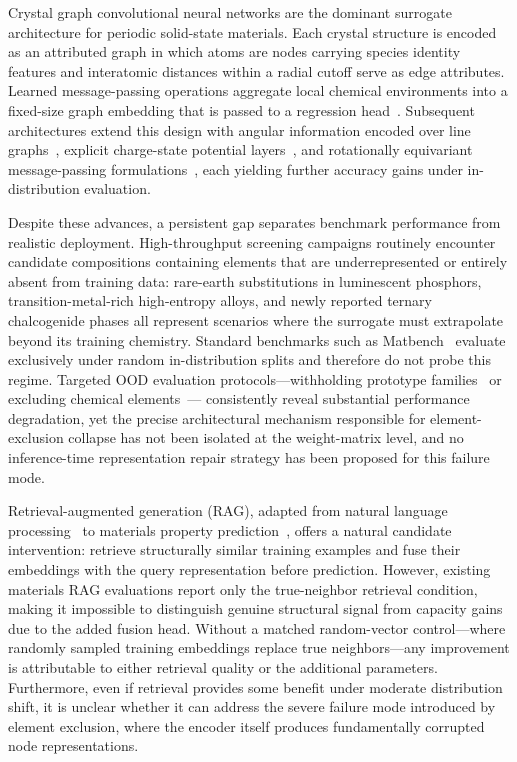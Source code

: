 \documentclass[final,5p,twocolumn,10pt]{elsarticle}
\begin{document}
Crystal graph convolutional neural networks are the dominant surrogate architecture
for periodic solid-state materials. Each crystal structure is encoded as an
attributed graph in which atoms are nodes carrying species identity features
and interatomic distances within a radial cutoff serve as edge attributes.
Learned message-passing operations aggregate local chemical environments into
a fixed-size graph embedding that is passed to a regression head~\cite{xie2018crystal}.
Subsequent architectures extend this design with angular information encoded
over line graphs~\cite{choudhary2021atomistic}, explicit charge-state potential
layers~\cite{deng2023chgnet}, and rotationally equivariant message-passing
formulations~\cite{batatia2022mace}, each yielding further accuracy gains
under in-distribution evaluation.

Despite these advances, a persistent gap separates benchmark performance from
realistic deployment. High-throughput screening campaigns routinely encounter
candidate compositions containing elements that are underrepresented or entirely
absent from training data: rare-earth substitutions in luminescent phosphors,
transition-metal-rich high-entropy alloys, and newly reported ternary chalcogenide
phases all represent scenarios where the surrogate must extrapolate beyond its
training chemistry. Standard benchmarks such as Matbench~\cite{dunn2020matbench}
evaluate exclusively under random in-distribution splits and therefore do not
probe this regime. Targeted OOD evaluation protocols---withholding prototype
families~\cite{omee2024} or excluding chemical elements~\cite{li2024, barroso2024data}---
consistently reveal substantial performance degradation, yet the precise
architectural mechanism responsible for element-exclusion collapse has not been
isolated at the weight-matrix level, and no inference-time representation repair
strategy has been proposed for this failure mode.

Retrieval-augmented generation (RAG), adapted from natural language
processing~\cite{lewis2020retrieval} to materials property
prediction~\cite{wang2024rag4mol, grag2024}, offers a natural candidate
intervention: retrieve structurally similar training examples and fuse
their embeddings with the query representation before prediction.
However, existing materials RAG evaluations report only the true-neighbor
retrieval condition, making it impossible to distinguish genuine structural
signal from capacity gains due to the added fusion head. Without a
matched random-vector control---where randomly sampled training embeddings
replace true neighbors---any improvement is attributable to either
retrieval quality or the additional parameters. Furthermore, even if
retrieval provides some benefit under moderate distribution shift, it is
unclear whether it can address the severe failure mode introduced by
element exclusion, where the encoder itself produces fundamentally
corrupted node representations.
\end{document}
